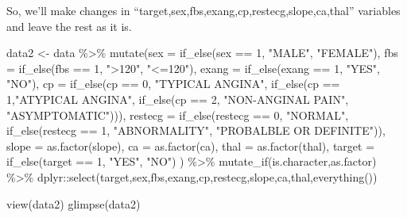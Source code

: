 \documentclass[
]{article}
\newenvironment{Shaded}{\begin{snugshade}}{\end{snugshade}}
\newcommand{\AttributeTok}[1]{\textcolor[rgb]{0.77,0.63,0.00}{#1}}
\newcommand{\DecValTok}[1]{\textcolor[rgb]{0.00,0.00,0.81}{#1}}
\newcommand{\FunctionTok}[1]{\textcolor[rgb]{0.00,0.00,0.00}{#1}}
\newcommand{\NormalTok}[1]{#1}
\newcommand{\OtherTok}[1]{\textcolor[rgb]{0.56,0.35,0.01}{#1}}
\newcommand{\SpecialCharTok}[1]{\textcolor[rgb]{0.00,0.00,0.00}{#1}}
\newcommand{\StringTok}[1]{\textcolor[rgb]{0.31,0.60,0.02}{#1}}
\begin{document}
So, we'll make changes in
``target,sex,fbs,exang,cp,restecg,slope,ca,thal'' variables and leave
the rest as it is.

\begin{Shaded}
\begin{Highlighting}[]
\NormalTok{data2 }\OtherTok{\textless{}{-}}\NormalTok{ data }\SpecialCharTok{\%\textgreater{}\%} 
  \FunctionTok{mutate}\NormalTok{(}\AttributeTok{sex =} \FunctionTok{if\_else}\NormalTok{(sex }\SpecialCharTok{==} \DecValTok{1}\NormalTok{, }\StringTok{"MALE"}\NormalTok{, }\StringTok{"FEMALE"}\NormalTok{),}
         \AttributeTok{fbs =} \FunctionTok{if\_else}\NormalTok{(fbs }\SpecialCharTok{==} \DecValTok{1}\NormalTok{, }\StringTok{"\textgreater{}120"}\NormalTok{, }\StringTok{"\textless{}=120"}\NormalTok{),}
         \AttributeTok{exang =} \FunctionTok{if\_else}\NormalTok{(exang }\SpecialCharTok{==} \DecValTok{1}\NormalTok{, }\StringTok{"YES"}\NormalTok{, }\StringTok{"NO"}\NormalTok{),}
         \AttributeTok{cp =} \FunctionTok{if\_else}\NormalTok{(cp }\SpecialCharTok{==} \DecValTok{0}\NormalTok{, }\StringTok{"TYPICAL ANGINA"}\NormalTok{,}
                      \FunctionTok{if\_else}\NormalTok{(cp }\SpecialCharTok{==} \DecValTok{1}\NormalTok{,}\StringTok{"ATYPICAL ANGINA"}\NormalTok{,}
                       \FunctionTok{if\_else}\NormalTok{(cp }\SpecialCharTok{==} \DecValTok{2}\NormalTok{, }\StringTok{"NON{-}ANGINAL PAIN"}\NormalTok{, }\StringTok{"ASYMPTOMATIC"}\NormalTok{))),}
         \AttributeTok{restecg =} \FunctionTok{if\_else}\NormalTok{(restecg }\SpecialCharTok{==} \DecValTok{0}\NormalTok{, }\StringTok{"NORMAL"}\NormalTok{,}
                            \FunctionTok{if\_else}\NormalTok{(restecg }\SpecialCharTok{==} \DecValTok{1}\NormalTok{, }\StringTok{"ABNORMALITY"}\NormalTok{, }\StringTok{"PROBALBLE OR DEFINITE"}\NormalTok{)),}
         \AttributeTok{slope =} \FunctionTok{as.factor}\NormalTok{(slope),}
         \AttributeTok{ca =} \FunctionTok{as.factor}\NormalTok{(ca),}
         \AttributeTok{thal =} \FunctionTok{as.factor}\NormalTok{(thal),}
         \AttributeTok{target =} \FunctionTok{if\_else}\NormalTok{(target }\SpecialCharTok{==} \DecValTok{1}\NormalTok{, }\StringTok{"YES"}\NormalTok{, }\StringTok{"NO"}\NormalTok{)}
\NormalTok{         ) }\SpecialCharTok{\%\textgreater{}\%} 
  \FunctionTok{mutate\_if}\NormalTok{(is.character,as.factor) }\SpecialCharTok{\%\textgreater{}\%} 
\NormalTok{  dplyr}\SpecialCharTok{::}\FunctionTok{select}\NormalTok{(target,sex,fbs,exang,cp,restecg,slope,ca,thal,}\FunctionTok{everything}\NormalTok{())}

\FunctionTok{view}\NormalTok{(data2)}
\FunctionTok{glimpse}\NormalTok{(data2)}
\end{Highlighting}
\end{Shaded}
\end{document}
